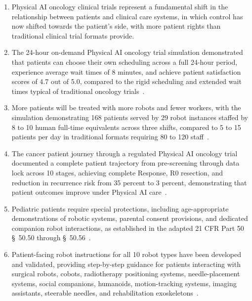 \documentclass[11pt,letterpaper]{article}
\begin{document}
\begin{enumerate}[label=(\alph*)]
\item Physical AI oncology clinical trials represent a fundamental shift in the
  relationship between patients and clinical care systems, in which control has
  now shifted towards the patient's side, with more patient rights than
  traditional clinical trial formats provide.

\item The 24-hour on-demand Physical AI oncology trial simulation demonstrated
  that patients can choose their own scheduling across a full 24-hour period,
  experience average wait times of 8 minutes, and achieve patient satisfaction
  scores of 4.7 out of 5.0, compared to the rigid scheduling and extended
  wait times typical of traditional oncology trials~\cite{newtrial2026}.

\item More patients will be treated with more robots and fewer workers, with the
  simulation demonstrating 168 patients served by 29 robot instances staffed
  by 8 to 10 human full-time equivalents across three shifts, compared to 5 to
  15 patients per day in traditional formats requiring 80 to 120
  staff~\cite{formatcomparison2026}.

\item The cancer patient journey through a regulated Physical AI oncology trial
  documented a complete patient trajectory from pre-screening through data
  lock across 10 stages, achieving complete Response, R0 resection, and
  reduction in recurrence risk from 35 percent to 3 percent, demonstrating
  that patient outcomes improve under Physical AI
  care~\cite{patientjourney2026}.

\item Pediatric patients require special protections, including age-appropriate
  demonstrations of robotic systems, parental consent provisions, and dedicated
  companion robot interactions, as established in the adapted 21 CFR Part 50
  \S~50.50 through \S~50.56~\cite{cfr50adapt}.

\item Patient-facing robot instructions for all 10 robot types have been
  developed and validated, providing step-by-step guidance for patients
  interacting with surgical robots, cobots, radiotherapy positioning systems,
  needle-placement systems, social companions, humanoids, motion-tracking
  systems, imaging assistants, steerable needles, and rehabilitation
  exoskeletons~\cite{patientinstructions2026}.


\end{enumerate}
\end{document}
